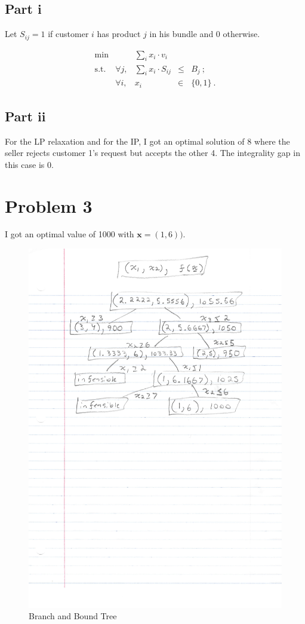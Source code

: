 \documentclass{article}
\begin{document}
\subsection{Part i}

Let $S_{ij} = 1$ if customer $i$ has product $j$ in his bundle and 0 otherwise.

\[
\begin{array}{rrrcl}
 \min & & \sum_i x_i \cdot v_i\\
 \mbox{s.t.}  &  \forall j,  & \sum_i x_i \cdot S_{ij}  & \le & B_j~;\\
 & \forall i, & x_i & \in & \{0,1\}~.
\end{array}
\]

\subsection{Part ii}

For the LP relaxation and for the IP, I got an optimal solution of 8 where the seller rejects customer 1's request but accepts the other 4. The integrality gap in this case is 0.

\section{Problem 3}

I got an optimal value of 1000 with $\mathbf{x} = (1,6))$.

\begin{figure} %
  \centering
  \includegraphics[angle=0,totalheight=125mm]{P3.pdf}
  \caption{Branch and Bound Tree}
  \label{fig:tabl}
\end{figure}
\end{document}
